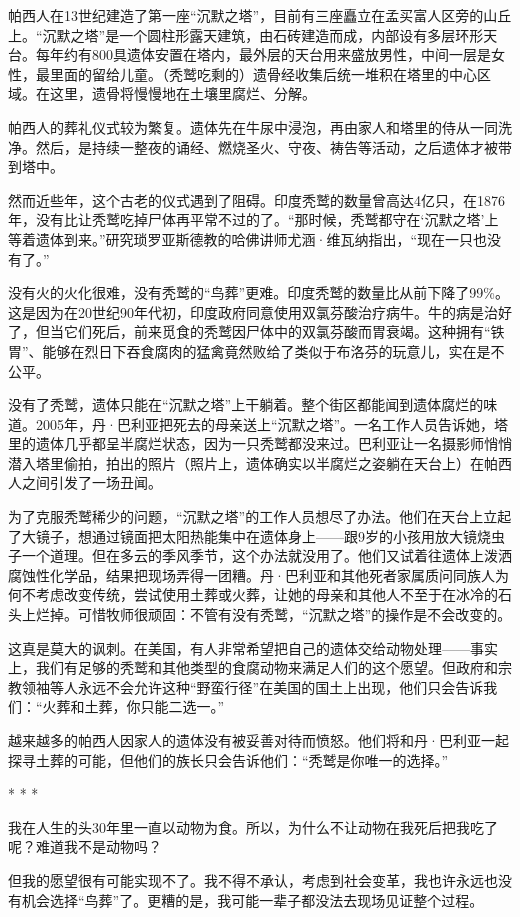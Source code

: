 \documentclass[12pt,oneside]{book}
\begin{document}
\begin{bookref}[frametitle={\cite{好好告别：世界葬礼观察手记}}]
帕西人在13世纪建造了第一座“沉默之塔”，目前有三座矗立在孟买富人区旁的山丘上。“沉默之塔”是一个圆柱形露天建筑，由石砖建造而成，内部设有多层环形天台。每年约有800具遗体安置在塔内，最外层的天台用来盛放男性，中间一层是女性，最里面的留给儿童。（秃鹫吃剩的）遗骨经收集后统一堆积在塔里的中心区域。在这里，遗骨将慢慢地在土壤里腐烂、分解。

帕西人的葬礼仪式较为繁复。遗体先在牛尿中浸泡，再由家人和塔里的侍从一同洗净。然后，是持续一整夜的诵经、燃烧圣火、守夜、祷告等活动，之后遗体才被带到塔中。

然而近些年，这个古老的仪式遇到了阻碍。印度秃鹫的数量曾高达4亿只，在1876年，没有比让秃鹫吃掉尸体再平常不过的了。“那时候，秃鹫都守在‘沉默之塔’上等着遗体到来。”研究琐罗亚斯德教的哈佛讲师尤涵·维瓦纳指出，“现在一只也没有了。”

没有火的火化很难，没有秃鹫的“鸟葬”更难。印度秃鹫的数量比从前下降了99\%。这是因为在20世纪90年代初，印度政府同意使用双氯芬酸治疗病牛。牛的病是治好了，但当它们死后，前来觅食的秃鹫因尸体中的双氯芬酸而胃衰竭。这种拥有“铁胃”、能够在烈日下吞食腐肉的猛禽竟然败给了类似于布洛芬的玩意儿，实在是不公平。

没有了秃鹫，遗体只能在“沉默之塔”上干躺着。整个街区都能闻到遗体腐烂的味道。2005年，丹·巴利亚把死去的母亲送上“沉默之塔”。一名工作人员告诉她，塔里的遗体几乎都呈半腐烂状态，因为一只秃鹫都没来过。巴利亚让一名摄影师悄悄潜入塔里偷拍，拍出的照片（照片上，遗体确实以半腐烂之姿躺在天台上）在帕西人之间引发了一场丑闻。

为了克服秃鹫稀少的问题，“沉默之塔”的工作人员想尽了办法。他们在天台上立起了大镜子，想通过镜面把太阳热能集中在遗体身上——跟9岁的小孩用放大镜烧虫子一个道理。但在多云的季风季节，这个办法就没用了。他们又试着往遗体上泼洒腐蚀性化学品，结果把现场弄得一团糟。丹·巴利亚和其他死者家属质问同族人为何不考虑改变传统，尝试使用土葬或火葬，让她的母亲和其他人不至于在冰冷的石头上烂掉。可惜牧师很顽固：不管有没有秃鹫，“沉默之塔”的操作是不会改变的。

这真是莫大的讽刺。在美国，有人非常希望把自己的遗体交给动物处理——事实上，我们有足够的秃鹫和其他类型的食腐动物来满足人们的这个愿望。但政府和宗教领袖等人永远不会允许这种“野蛮行径”在美国的国土上出现，他们只会告诉我们：“火葬和土葬，你只能二选一。”

越来越多的帕西人因家人的遗体没有被妥善对待而愤怒。他们将和丹·巴利亚一起探寻土葬的可能，但他们的族长只会告诉他们：“秃鹫是你唯一的选择。”

\begin{center}
* * *
\end{center}
我在人生的头30年里一直以动物为食。所以，为什么不让动物在我死后把我吃了呢？难道我不是动物吗？

但我的愿望很有可能实现不了。我不得不承认，考虑到社会变革，我也许永远也没有机会选择“鸟葬”了。更糟的是，我可能一辈子都没法去现场见证整个过程。

\end{bookref}
\end{document}
